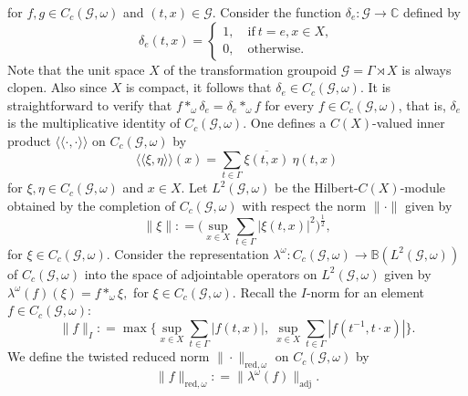 \documentclass[a4paper,11pt,reqno]{amsart}
\theoremstyle{plain}
\theoremstyle{mainthmstyle}
\theoremstyle{named}
\numberwithin{equation}{section}
\begin{document}
 for $f, g \in C_c (\mathcal G, \omega)$ and $(t, x) \in \mathcal G.$
Consider the function $\delta_e \colon  \mathcal G \to \mathbb C$ defined by 
\begin{equation}\label{eq:0} \delta_e (t, x) = \begin{cases} 1, \quad \text {if}\ t = e, x \in X, \\ 0, \quad \text {otherwise.} \end{cases}\end{equation}
Note that the unit space $X$ of the transformation groupoid $\mathcal G = \Gamma \rtimes X$ is always clopen. Also since $X$ is compact, it follows that $\delta_e \in C_c (\mathcal G, \omega)$. It is straightforward to verify that $f \ast_{\omega} \delta_e = \delta_e \ast_{\omega} f$ for every $f \in C_c (\mathcal G,\omega)$, that is, $\delta_e$ is the multiplicative identity of $C_c (\mathcal G,\omega).$ One defines a $C(X)$-valued inner product $\langle \langle \cdot, \cdot \rangle \rangle$ on $C_c (\mathcal G, \omega)$ by
\begin{displaymath}\langle \langle \xi, \eta \rangle \rangle (x) = \sum\limits_{t \in \Gamma} \overline {\xi (t, x)}\ {\eta (t, x)}\end{displaymath} 
for $\xi, \eta \in C_c (\mathcal G, \omega)$ and $x \in X.$ Let $L^2 (\mathcal G, \omega)$ be the Hilbert-$C (X)$-module obtained by the completion of $C_c (\mathcal G, \omega)$ with respect the norm $\| \cdot \|$ given by
\begin{displaymath}
    \|\xi\| : = \biggr ( \sup\limits_{x \in X}  \sum\limits_{t \in \Gamma} \left \lvert \xi(t, x) \right \rvert^2 \biggr )^{\frac {1} {2}},\end{displaymath}
for $\xi \in C_c (\mathcal G, \omega).$ Consider the representation $\lambda^{\omega} \colon C_c (\mathcal G, \omega) \to \mathbb B (L^2 (\mathcal G, \omega))$ of $C_c (\mathcal G, \omega)$ into the space of adjointable operators on $L^2 (\mathcal G, \omega)$ given by $\lambda^{\omega} (f) (\xi) = f \ast_{\omega} \xi,$ for $\xi \in C_c (\mathcal G, \omega).$ Recall the $I$-norm for an element $f\in C_{c}(\mathcal{G},\omega)$: 
$$\|f\|_I : = \max \biggr \{\sup\limits_{x \in X} \sum\limits_{t \in \Gamma} \left \lvert f (t, x) \right \rvert,\ \sup\limits_{x \in X} \sum\limits_{t \in \Gamma} \left \lvert f \left (t^{-1}, t \cdot x \right ) \right \rvert \biggr \}.$$ 
We define the twisted reduced norm $\|\cdot \|_{\text {red}, \omega}$ on $C_c (\mathcal G,\omega)$ by
\begin{displaymath}\|f\|_{\text {red}, \omega} : = \|\lambda^{\omega} (f) \|_{\text {adj}}.\end{displaymath} 
\end{document}
